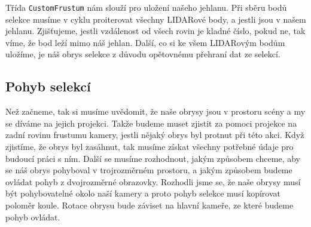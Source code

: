 \documentclass[czech,bachelor,dept420,male,cpdeclaration]{diploma}
\begin{document}
 

Třída \texttt{CustomFrustum} nám slouží pro uložení našeho jehlanu. Při sběru bodů selekce musíme v cyklu proiterovat všechny LIDARové body, a jestli jsou v našem jehlanu. Zjišťujeme, jestli vzdálenost od všech rovin je kladné číslo, pokud ne, tak víme, že bod leží mimo náš jehlan. Další, co si ke všem LIDARovým bodům uložíme, je náš obrys selekce z důvodu opětovnému přehraní dat ze selekcí.



\subsection{Pohyb selekcí} 
Než začneme, tak si musíme uvědomit, že naše obrysy jsou v prostoru scény a my se díváme na jejich projekci. Takže budeme muset zjistit za pomoci projekce na zadní rovinu frustumu kamery, jestli nějaký obrys byl protnut při této akci. Když zjistíme, že obrys byl zasáhnut, tak musíme získat všechny potřebné údaje pro budoucí práci s ním. Další se musíme rozhodnout, jakým způsobem chceme, aby se náš obrys pohyboval v trojrozměrném prostoru, a jakým způsobem budeme ovládat pohyb z dvojrozměrné obrazovky. Rozhodli jsme se, že naše obrysy musí být pohybovatelné okolo naší kamery a proto pohyb selekce musí kopírovat poloměr koule. Rotace obrysu bude záviset na hlavní kameře, ze které budeme pohyb ovládat.

\medskip
\begin{minipage}{\linewidth}
 
\end{minipage}
\end{document}
